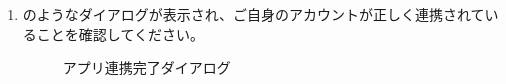 \begin{enumerate}
                \newpage
                \item {}のようなダイアログが表示され、ご自身のアカウントが正しく連携されていることを確認してください。
                    \begin{figure}[htbp]
                        \centering
                        \caption{アプリ連携完了ダイアログ}
                        \label{img:misskey7}
                    \end{figure}
            \end{enumerate}

        \newpage
